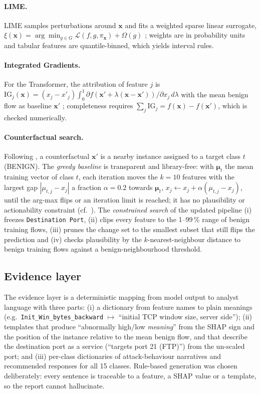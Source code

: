 \documentclass[11pt,a4paper]{article}
\newcommand{\feat}[1]{\texttt{#1}}
\begin{document}
\paragraph{LIME.} LIME samples perturbations around $\mathbf{x}$ and fits a weighted sparse linear surrogate, $\xi(\mathbf{x})=\arg\min_{g\in G}\mathcal{L}(f,g,\pi_{\mathbf{x}})+\Omega(g)$ \parencite{ribeiro2016}; weights are in probability units and tabular features are quantile-binned, which yields interval rules.

\paragraph{Integrated Gradients.} For the Transformer, the attribution of feature $j$ is $\mathrm{IG}_j(\mathbf{x})=(x_j-x'_j)\int_0^1\partial f(\mathbf{x}'+\lambda(\mathbf{x}-\mathbf{x}'))/\partial x_j\,d\lambda$ with the mean benign flow as baseline $\mathbf{x}'$ \parencite{sundararajan2017}; completeness requires $\sum_j\mathrm{IG}_j=f(\mathbf{x})-f(\mathbf{x}')$, which is checked numerically.

\paragraph{Counterfactual search.} Following \textcite{wachter2018}, a counterfactual $\mathbf{x}'$ is a nearby instance assigned to a target class $t$ (BENIGN). The \emph{greedy baseline} is transparent and library-free: with $\boldsymbol{\mu}_t$ the mean training vector of class $t$, each iteration moves the $k=10$ features with the largest gap $|\mu_{t,j}-x_j|$ a fraction $\alpha=0.2$ towards $\boldsymbol{\mu}_t$, $x_j\leftarrow x_j+\alpha(\mu_{t,j}-x_j)$, until the arg-max flips or an iteration limit is reached; it has no plausibility or actionability constraint (cf.\ \citeauthor{galwaduge2025}). The \emph{constrained search} of the updated pipeline (i) freezes \feat{Destination Port}, (ii) clips every feature to the 1--99\,\% range of benign training flows, (iii) prunes the change set to the smallest subset that still flips the prediction and (iv) checks plausibility by the $k$-nearest-neighbour distance to benign training flows against a benign-neighbourhood threshold.

\subsection{Evidence layer}
The evidence layer is a deterministic mapping from model output to analyst language with three parts: (i) a dictionary from feature names to plain meanings (e.g.\ \feat{Init_Win_bytes_backward} $\mapsto$ ``initial TCP window size, server side''); (ii) templates that produce ``abnormally high/low \emph{meaning}'' from the SHAP sign and the position of the instance relative to the mean benign flow, and that describe the destination port as a service (``targets port 21 (FTP)'') from the un-scaled port; and (iii) per-class dictionaries of attack-behaviour narratives and recommended responses for all 15 classes. Rule-based generation was chosen deliberately: every sentence is traceable to a feature, a SHAP value or a template, so the report cannot hallucinate.
\end{document}
